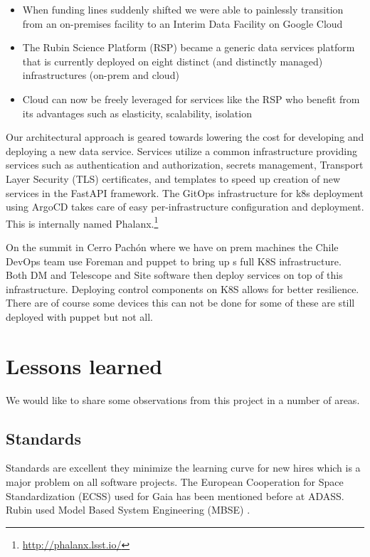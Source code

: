 \documentclass[11pt,twoside]{article}
\begin{document}
\begin{itemize}
\item When funding lines suddenly shifted we were able to painlessly transition from an on-premises facility to an Interim Data Facility on Google Cloud
\item The Rubin Science Platform (RSP) became a generic data services platform that is currently deployed on eight distinct (and distinctly managed) infrastructures (on-prem and cloud)
\item Cloud can now be freely leveraged for services like the RSP who benefit from its advantages such as elasticity, scalability, isolation
\end{itemize}

Our architectural approach is geared towards lowering the cost for developing and deploying a new data service.
Services utilize a common infrastructure providing services such as authentication and authorization, secrets management, Transport Layer Security (TLS) certificates, and templates to speed up creation of new services in the FastAPI framework.
The GitOps infrastructure for k8s deployment using ArgoCD takes care of easy per-infrastructure configuration and deployment.
This is internally named Phalanx.\footnote{\url{http://phalanx.lsst.io/}}

On the summit in Cerro Pachón where we have on prem machines the Chile DevOps team use Foreman and puppet to bring up s full K8S infrastructure.
Both DM and Telescope and Site software then deploy services on top of this infrastructure.
Deploying control components on K8S allows for better resilience.
There are of course some devices this can not be done for some of these are still deployed with puppet but not all.


\section{Lessons learned}
We would like to share some observations from this project in a number of areas.
\subsection{Standards}
Standards are excellent they minimize the learning curve for new hires which is a major problem on all software projects.
The European Cooperation for Space Standardization (ECSS) used for Gaia has been mentioned before \citep{2007arXiv0712.0249O} at ADASS.
 Rubin used Model Based System Engineering (MBSE) \citep{2018SPIE10705E..0US}.
\end{document}
